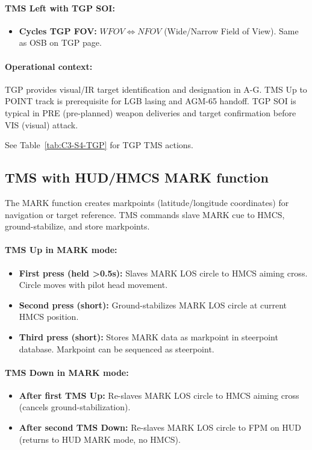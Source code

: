 \documentclass[11pt, a4paper, twoside]{report}
\begin{document}
\paragraph{TMS Left with TGP SOI:}
\begin{itemize}
    \item \textbf{Cycles TGP FOV:} $WFOV \iff NFOV$ (Wide/Narrow Field of View). Same as OSB on TGP page.
\end{itemize}

\paragraph{Operational context:}
TGP provides visual/IR target identification and designation in A-G. TMS Up to POINT track is prerequisite for LGB lasing and AGM-65 handoff. TGP SOI is typical in PRE (pre-planned) weapon deliveries and target confirmation before VIS (visual) attack.

See Table~\ref{tab:C3-S4-TGP} for TGP TMS actions.

\subsection{TMS with HUD/HMCS MARK function}
\label{sec:C3-S4-S3}

The MARK function creates markpoints (latitude/longitude coordinates) for navigation or target reference. TMS commands slave MARK cue to HMCS, ground-stabilize, and store markpoints.

\paragraph{TMS Up in MARK mode:}
\begin{itemize}
    \item \textbf{First press (held >0.5s):} Slaves MARK LOS circle to HMCS aiming cross. Circle moves with pilot head movement.
    \item \textbf{Second press (short):} Ground-stabilizes MARK LOS circle at current HMCS position.
    \item \textbf{Third press (short):} Stores MARK data as markpoint in steerpoint database. Markpoint can be sequenced as steerpoint.
\end{itemize}

\paragraph{TMS Down in MARK mode:}
\begin{itemize}
    \item \textbf{After first TMS Up:} Re-slaves MARK LOS circle to HMCS aiming cross (cancels ground-stabilization).
    \item \textbf{After second TMS Down:} Re-slaves MARK LOS circle to FPM on HUD (returns to HUD MARK mode, no HMCS).
\end{itemize}
\end{document}
